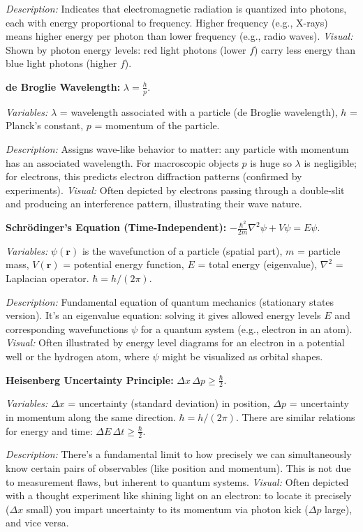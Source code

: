 \documentclass{article}
\begin{document}
\textit{Description:} Indicates that electromagnetic radiation is quantized into photons, each with energy proportional to frequency. Higher frequency (e.g., X-rays) means higher energy per photon than lower frequency (e.g., radio waves). \textit{Visual:} Shown by photon energy levels: red light photons (lower $f$) carry less energy than blue light photons (higher $f$).

\textbf{de Broglie Wavelength:} $\displaystyle \lambda = \frac{h}{p}$.

\textit{Variables:} $\lambda$ = wavelength associated with a particle (de Broglie wavelength), $h$ = Planck’s constant, $p$ = momentum of the particle.

\textit{Description:} Assigns wave-like behavior to matter: any particle with momentum has an associated wavelength. For macroscopic objects $p$ is huge so $\lambda$ is negligible; for electrons, this predicts electron diffraction patterns (confirmed by experiments). \textit{Visual:} Often depicted by electrons passing through a double-slit and producing an interference pattern, illustrating their wave nature.

\textbf{Schrödinger’s Equation (Time-Independent):} $-\frac{\hbar^2}{2m}\nabla^2 \psi + V \psi = E \psi$.

\textit{Variables:} $\psi(\mathbf{r})$ is the wavefunction of a particle (spatial part), $m$ = particle mass, $V(\mathbf{r})$ = potential energy function, $E$ = total energy (eigenvalue), $\nabla^2$ = Laplacian operator. $\hbar = h/(2\pi)$.

\textit{Description:} Fundamental equation of quantum mechanics (stationary states version). It’s an eigenvalue equation: solving it gives allowed energy levels $E$ and corresponding wavefunctions $\psi$ for a quantum system (e.g., electron in an atom). \textit{Visual:} Often illustrated by energy level diagrams for an electron in a potential well or the hydrogen atom, where $\psi$ might be visualized as orbital shapes.

\textbf{Heisenberg Uncertainty Principle:} $\displaystyle \Delta x\,\Delta p \ge \frac{\hbar}{2}$.

\textit{Variables:} $\Delta x$ = uncertainty (standard deviation) in position, $\Delta p$ = uncertainty in momentum along the same direction. $\hbar = h/(2\pi)$. There are similar relations for energy and time: $\Delta E\,\Delta t \ge \frac{\hbar}{2}$.

\textit{Description:} There’s a fundamental limit to how precisely we can simultaneously know certain pairs of observables (like position and momentum). This is not due to measurement flaws, but inherent to quantum systems. \textit{Visual:} Often depicted with a thought experiment like shining light on an electron: to locate it precisely ($\Delta x$ small) you impart uncertainty to its momentum via photon kick ($\Delta p$ large), and vice versa.
\end{document}
